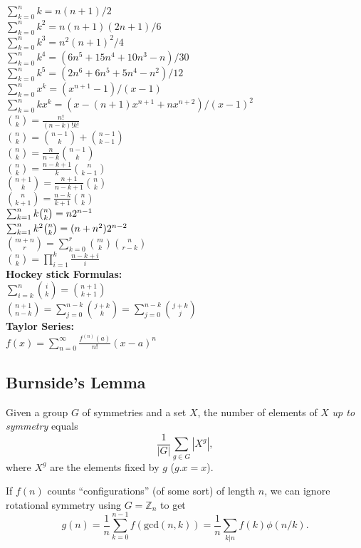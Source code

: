 \documentclass[letterpaper,landscape]{article}
\begin{document}
\begin{multicols*}{3}
    $\sum_{k=0}^{n}k=n(n+1)/2$\\
    $\sum_{k=0}^{n}k^{2}=n(n+1)(2n+1)/6$\\
    $\sum_{k=0}^{n}k^{3}=n^{2}(n+1)^{2}/4$\\
    $\sum_{k=0}^{n}k^{4}=(6n^{5}+15n^{4}+10n^{3}-n)/30$\\
    $\sum_{k=0}^{n}k^{5}=(2n^{6}+6n^{5}+5n^{4}-n^{2})/12$\\
    $\sum_{k=0}^{n}x^{k}=(x^{n+1}-1)/(x-1)$\\
    $\sum_{k=0}^{n}kx^{k}=(x-(n+1)x^{n+1}+nx^{n+2})/(x-1)^{2}$\\
    ${n \choose k}=\frac{n!}{(n-k)!k!}$\\
    ${n \choose k}={n-1 \choose k}+{n-1 \choose k-1}$\\
    ${n \choose k}=\frac{n}{n-k}{n-1 \choose k}$\\
    ${n \choose k}=\frac{n-k+1}{k}{n \choose k-1}$\\
    ${n+1 \choose k}=\frac{n+1}{n-k+1}{n \choose k}$\\
    ${n \choose k+1}=\frac{n-k}{k+1}{n \choose k}$\\
    $\sum_{k=1}^{n}k\tbinom{n}{k}=n2^{n-1}$\\
    $\sum_{k=1}^{n}k^{2}\tbinom{n}{k}=(n+n^{2})2^{n-2}$\\
    ${m+n \choose r}=\sum_{k=0}^{r}{m \choose k}{n \choose r-k}$\\
    ${n \choose k}=\prod_{i=1}^{k}\frac{n-k+i}{i}$\\
    \textbf{Hockey stick Formulas:}\\
    $\sum_{i=k}^n {i \choose k} = {n+1 \choose k+1}$\\
    ${n+1 \choose n-k} = \sum_{j=0}^{n-k} {j+k \choose k} = \sum_{j=0}^{n-k} {j+k \choose j}$\\
    \textbf{Taylor Series:}\\
    $f(x) = \sum_{n=0}^\infty \frac{f^{(n)}(a)}{n!}(x-a)^n$
  
    \subsection{Burnside's Lemma}
    Given a group $G$ of symmetries and a set $X$, the number of elements of $X$ \emph{up to symmetry} equals
		 \[ {\frac {1}{|G|}}\sum _{{g\in G}}|X^{g}|, \]
		 where $X^{g}$ are the elements fixed by $g$ ($g.x = x$).

		 If $f(n)$ counts ``configurations'' (of some sort) of length $n$, we can ignore rotational symmetry using $G = \mathbb Z_n$ to get
		 \[ g(n) = \frac 1 n \sum_{k=0}^{n-1}{f(\text{gcd}(n, k))} = \frac 1 n \sum_{k|n}{f(k)\phi(n/k)}. \]

\end{multicols*}
\end{document}
